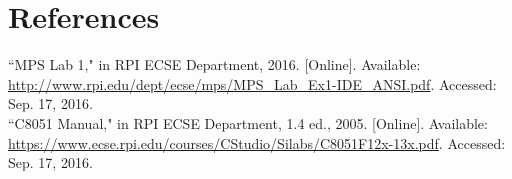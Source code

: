 \documentclass[12pt]{article}
\begin{document}
	
\section{References} 
\noindent
``MPS Lab 1," in RPI ECSE Department, 2016. [Online]. Available: \url{http://www.rpi.edu/dept/ecse/mps/MPS_Lab_Ex1-IDE_ANSI.pdf}. Accessed: Sep. 17, 2016.\\
\newline\noindent
``C8051 Manual," in RPI ECSE Department, 1.4 ed., 2005. [Online]. Available: \url{https://www.ecse.rpi.edu/courses/CStudio/Silabs/C8051F12x-13x.pdf}. Accessed: Sep. 17, 2016.
\end{document}
